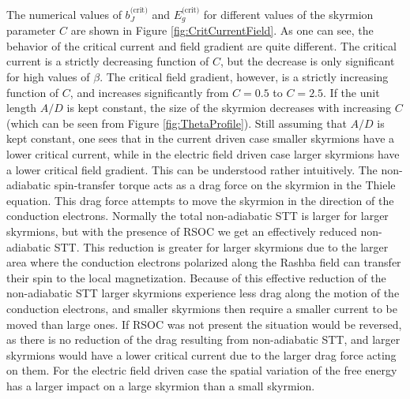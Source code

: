 The numerical values of $b_J^{\text{(crit)}}$ and $E_g^{\text{(crit)}}$ for different values of the skyrmion parameter $C$ are shown in Figure \ref{fig:CritCurrentField}. As one can see, the behavior of the critical current and field gradient are quite different. The critical current is a strictly decreasing function of $C$, but the decrease is only significant for high values of $\beta$. The critical field gradient, however, is a strictly increasing function of $C$, and increases significantly from $C = 0.5$ to $C = 2.5$. If the unit length $A/D$ is kept constant, the size of the skyrmion decreases with increasing $C$ (which can be seen from Figure \ref{fig:ThetaProfile}). Still assuming that $A/D$ is kept constant, one sees that in the current driven case smaller skyrmions have a lower critical current, while in the electric field driven case larger skyrmions have a lower critical field gradient. This can be understood rather intuitively. The non-adiabatic spin-transfer torque acts as a drag force on the skyrmion in the Thiele equation. This drag force attempts to move the skyrmion in the direction of the conduction electrons. Normally the total non-adiabatic STT is larger for larger skyrmions, but with the presence of RSOC we get an effectively reduced non-adiabatic STT. This reduction is greater for larger skyrmions due to the larger area where the conduction electrons polarized along the Rashba field can transfer their spin to the local magnetization. Because of this effective reduction of the non-adiabatic STT larger skyrmions experience less drag along the motion of the conduction electrons, and smaller skyrmions then require a smaller current to be moved than large ones. If RSOC was not present the situation would be reversed, as there is no reduction of the drag resulting from non-adiabatic STT, and larger skyrmions would have a lower critical current due to the larger drag force acting on them. For the electric field driven case the spatial variation of the free energy has a larger impact on a large skyrmion than a small skyrmion.

